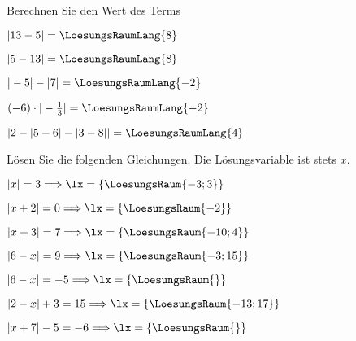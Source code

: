 
\renewcommand{\bbwAufgabenBlockID}{A1B}

\renewcommand{\metaHeaderLine}{Aufgabenblatt}
\renewcommand{\arbeitsblattTitel}{Algebra: Betrag}



\arbeitsblattHeader{}
Berechnen Sie den Wert des Terms

\begin{bbwAufgabenBlock}
\item $|13-5| = \LoesungsRaumLang{8}$
\item $|5-13| = \LoesungsRaumLang{8}$
\item $|-5| - |7| = \LoesungsRaumLang{-2}$
\item $(-6)\cdot{}|-\frac{1}{3}| = \LoesungsRaumLang{-2}$
\item $|2 - |5-6| - |3-8|| = \LoesungsRaumLang{4}$
\end{bbwAufgabenBlock}

\platzFuerBerechnungenBisEndeSeite{}



Lösen Sie die folgenden Gleichungen. Die Lösungsvariable ist stets $x$.

\begin{bbwAufgabenBlock}
\item $|x|=3 \Longrightarrow \lx=\{ \LoesungsRaum{-3; 3\}}$
\item $|x+2|=0 \Longrightarrow \lx=\{ \LoesungsRaum{-2\}}$
\item $|x+3|=7 \Longrightarrow \lx=\{ \LoesungsRaum{-10;4\}}$
\item $|6-x|=9 \Longrightarrow \lx=\{ \LoesungsRaum{-3;15\}}$
\item $|6-x|=-5 \Longrightarrow \lx=\{ \LoesungsRaum{\}}$
\item $|2-x|+3=15 \Longrightarrow \lx=\{ \LoesungsRaum{-13;17\}}$
\item $|x+7|-5=-6 \Longrightarrow \lx=\{ \LoesungsRaum{\}}$
\end{bbwAufgabenBlock}


\platzFuerBerechnungenBisEndeSeite{}

\platzFuerBerechnungenBisEndeSeite{}


